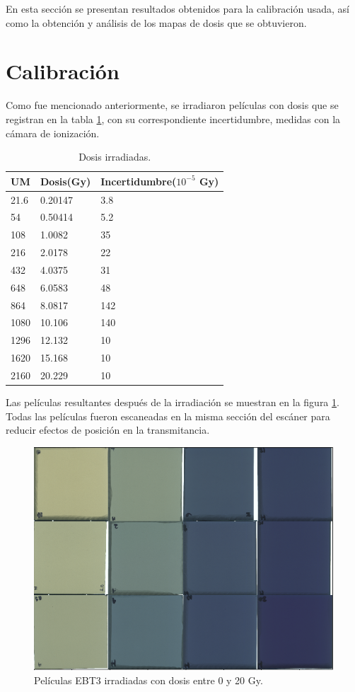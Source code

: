 En esta sección se presentan resultados obtenidos para la calibración usada, así como la obtención y análisis de los mapas de dosis que se obtuvieron.
\section{Calibración}
Como fue mencionado anteriormente, se irradiaron películas con dosis que se registran en la tabla \ref{tab:DosisIrra}, con su correspondiente incertidumbre, medidas con la cámara de ionización.\\

\begin{table}[]
	\centering
	\begin{tabular}{|l|l|l|}
		\hline
		UM& Dosis(Gy)    & Incertidumbre($10^{-5}$ Gy) \\ \hline
		21.6&0.20147 & 3.8\\ \hline
		54&0.50414 & 5.2 \\ \hline
		108&1.0082  & 35\\ \hline
		216&2.0178  & 22\\ \hline
		432&4.0375 & 31 \\ \hline
		648&6.0583   & 48\\ \hline
		864&8.0817  & 142\\ \hline
		1080&10.106  & 140\\ \hline
		1296&12.132   & 10\\ \hline
		1620&15.168   & 10\\ \hline
		2160&20.229   & 10\\ \hline
	\end{tabular}
	\caption{Dosis irradiadas.}
	\label{tab:DosisIrra}
\end{table}

Las películas resultantes después de la irradiación se muestran en la figura \ref{fig:peliculasIrradiacion}. Todas las películas fueron escaneadas en la misma sección del escáner para reducir efectos de posición en la transmitancia.\\
\begin{figure}[H]
	\centering
	\includegraphics[width=0.7\linewidth]{images/peliculasIrradiadas.png}
	\caption{Películas EBT3 irradiadas con dosis entre 0 y 20 Gy. }
	\label{fig:peliculasIrradiacion}
\end{figure}

